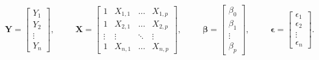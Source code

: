 \begin{equation*}
    \textbf{Y} = \begin{bmatrix}
                    Y_1 \\
                    Y_2 \\
                    \vdots \\
                    Y_n
                 \end{bmatrix}
    ,\>\>\>\>\>\>\>\>\>\>\> 
    \textbf{X} = \begin{bmatrix}
                    1 & X_{1, 1} & \ldots & X_{1, p} \\
                    1 & X_{2, 1} & \ldots & X_{2, p} \\
                    \vdots & \vdots & \ddots & \vdots \\
                    1 & X_{n, 1} & \ldots & X_{n, p}
                 \end{bmatrix}
    ,\>\>\>\>\>\>\>\>\>\>\>
    \bm{\beta} = \begin{bmatrix}
                            \beta_0 \\
                            \beta_1 \\
                            \vdots \\
                            \beta_p
                       \end{bmatrix}
    ,\>\>\>\>\>\>\>\>\>\>\>
    \bm{\epsilon} = \begin{bmatrix}
                            \epsilon_1 \\
                            \epsilon_2 \\
                            \vdots \\
                            \epsilon_n
                       \end{bmatrix}.
\end{equation*}

